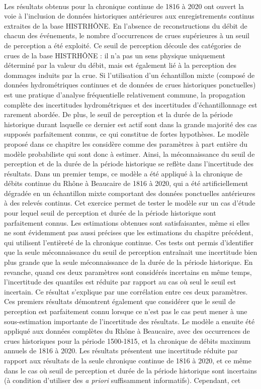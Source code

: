 	\paragraph{} Les résultats obtenus pour la chronique continue de 1816 à 2020 ont ouvert la voie à l'inclusion de données historiques antérieures aux enregistrements continus extraites de la base HISTRHÔNE. En l'absence de reconstructions du débit de chacun des événements, le nombre d'occurrences de crues supérieures à un seuil de perception a été exploité. Ce seuil de perception découle des catégories de crues de la base HISTRHÔNE : il n'a pas un sens physique uniquement déterminé par la valeur du débit, mais est également lié à la perception des dommages induits par la crue. Si l'utilisation d'un échantillon mixte (composé de données hydrométriques continues et de données de crues historiques ponctuelles) est une pratique d'analyse fréquentielle relativement commune, la propagation complète des incertitudes hydrométriques et des incertitudes d'échantillonnage est rarement abordée. De plus, le seuil de perception et la durée de la période historique durant laquelle ce dernier est actif sont dans la grande majorité des cas supposés parfaitement connus, ce qui constitue de fortes hypothèses. Le modèle proposé dans ce chapitre les considère comme des paramètres à part entière du modèle probabiliste qui sont donc à estimer. Ainsi, la méconnaissance du seuil de perception et de la durée de la période historique se reflète dans l'incertitude des résultats. Dans un premier temps, ce modèle a été appliqué à la chronique de débits continue du Rhône à Beaucaire de 1816 à 2020, qui a été artificiellement dégradée en un échantillon mixte comportant des données ponctuelles antérieures à des relevés continus. Cet exercice permet de tester le modèle sur un cas d'étude pour lequel seuil de perception et durée de la période historique sont parfaitement connus. Les estimations obtenues sont satisfaisantes, même si elles ne sont évidemment pas aussi précises que les estimations du chapitre précédent, qui utilisent l'entièreté de la chronique continue. Ces tests ont permis d'identifier que la seule méconnaissance du seuil de perception entraînait une incertitude bien plus grande que la seule méconnaissance de la durée de la période historique. En revanche, quand ces deux paramètres sont considérés incertains en même temps, l'incertitude des quantiles est réduite par rapport au cas où seul le seuil est incertain. Ce résultat s'explique par une corrélation entre ces deux paramètres. Ces premiers résultats démontrent également que considérer que le seuil de perception est parfaitement connu lorsque ce n'est pas le cas peut mener à une sous-estimation importante de l'incertitude des résultats. Le modèle a ensuite été appliqué aux données complètes du Rhône à Beaucaire, avec des occurrences de crues historiques pour la période 1500-1815, et la chronique de débits maximum annuels de 1816 à 2020. Les résultats présentent une incertitude réduite par rapport aux résultats de la seule chronique continue de 1816 à 2020, et ce même dans le cas où seuil de perception et durée de la période historique sont incertains (à condition d'utiliser des \textit{a priori} suffisamment informatifs). Cependant, cet 